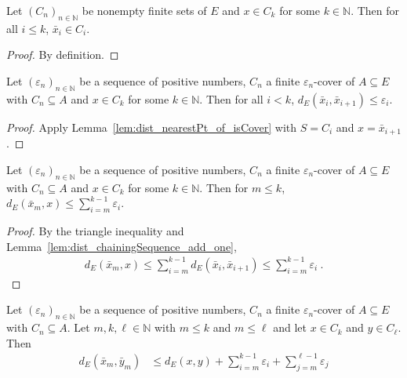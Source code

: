 \begin{lemma}\label{lem:chainingSequence_mem}
  \leanok
Let $(C_n)_{n \in \mathbb{N}}$ be nonempty finite sets of $E$ and $x \in C_k$ for some $k \in \mathbb{N}$.
Then for all $i \le k$, $\bar{x}_i\in C_i$.
\end{lemma}

\begin{proof}\leanok
By definition.
\end{proof}


\begin{lemma}\label{lem:dist_chainingSequence_add_one}
  \leanok
Let $(\varepsilon_n)_{n \in \mathbb{N}}$ be a sequence of positive numbers, $C_n$ a finite $\varepsilon_n$-cover of $A \subseteq E$ with $C_n \subseteq A$ and $x \in C_k$ for some $k \in \mathbb{N}$.
Then for all $i < k$, $d_E(\bar{x}_i, \bar{x}_{i+1}) \le \varepsilon_i$.
\end{lemma}

\begin{proof}\leanok
Apply Lemma~\ref{lem:dist_nearestPt_of_isCover} with $S = C_i$ and $x = \bar{x}_{i+1}$.
\end{proof}


\begin{lemma}\label{lem:dist_chainingSequence_le_sum}
  \leanok
Let $(\varepsilon_n)_{n \in \mathbb{N}}$ be a sequence of positive numbers, $C_n$ a finite $\varepsilon_n$-cover of $A \subseteq E$ with $C_n \subseteq A$ and $x \in C_k$ for some $k \in \mathbb{N}$.
Then for $m \le k$, $d_E(\bar{x}_m, x) \le \sum_{i=m}^{k-1} \varepsilon_i$.
\end{lemma}

\begin{proof}\leanok
By the triangle inequality and Lemma~\ref{lem:dist_chainingSequence_add_one},
\begin{align*}
  d_E(\bar{x}_m, x)
  \le \sum_{i=m}^{k-1} d_E(\bar{x}_i, \bar{x}_{i+1})
  \le \sum_{i=m}^{k-1} \varepsilon_i
  \: .
\end{align*}
\end{proof}


\begin{lemma}\label{lem:dist_chainingSequence_le}
  \leanok
Let $(\varepsilon_n)_{n \in \mathbb{N}}$ be a sequence of positive numbers, $C_n$ a finite $\varepsilon_n$-cover of $A \subseteq E$ with $C_n \subseteq A$.
Let $m, k, \ell \in \mathbb{N}$ with $m \le k$ and $m \le \ell$ and let $x \in C_k$ and $y \in C_\ell$.
Then
\begin{align*}
  d_E(\bar{x}_m, \bar{y}_m)
  &\le d_E(x, y) + \sum_{i=m}^{k-1} \varepsilon_i + \sum_{j=m}^{\ell-1} \varepsilon_j
\end{align*}
\end{lemma}

